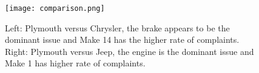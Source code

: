 % 
% 

	\begin{figure}
	 \centering  
	 \texttt{[image: comparison.png]}
	 \caption[Comparison View]{Left: Plymouth versus Chrysler, the brake appears to
	 be the dominant issue and Make 14 has the higher rate of complaints. Right:
	 Plymouth versus Jeep, the engine is the dominant issue and Make 1 has higher
	 rate of complaints.}
	 \label{figure:comparison}
	\end{figure}

